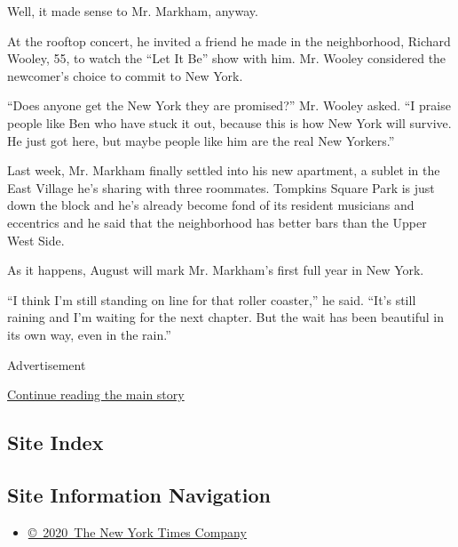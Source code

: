 Well, it made sense to Mr. Markham, anyway.

At the rooftop concert, he invited a friend he made in the neighborhood,
Richard Wooley, 55, to watch the ``Let It Be'' show with him. Mr. Wooley
considered the newcomer's choice to commit to New York.

``Does anyone get the New York they are promised?'' Mr. Wooley asked.
``I praise people like Ben who have stuck it out, because this is how
New York will survive. He just got here, but maybe people like him are
the real New Yorkers.''

Last week, Mr. Markham finally settled into his new apartment, a sublet
in the East Village he's sharing with three roommates. Tompkins Square
Park is just down the block and he's already become fond of its resident
musicians and eccentrics and he said that the neighborhood has better
bars than the Upper West Side.

As it happens, August will mark Mr. Markham's first full year in New
York.

``I think I'm still standing on line for that roller coaster,'' he said.
``It's still raining and I'm waiting for the next chapter. But the wait
has been beautiful in its own way, even in the rain.''

Advertisement

\protect\hyperlink{after-bottom}{Continue reading the main story}

\hypertarget{site-index}{%
\subsection{Site Index}\label{site-index}}

\hypertarget{site-information-navigation}{%
\subsection{Site Information
Navigation}\label{site-information-navigation}}

\begin{itemize}
\tightlist
\item
  \href{https://help.nytimes3xbfgragh.onion/hc/en-us/articles/115014792127-Copyright-notice}{©~2020~The
  New York Times Company}
\end{itemize}

